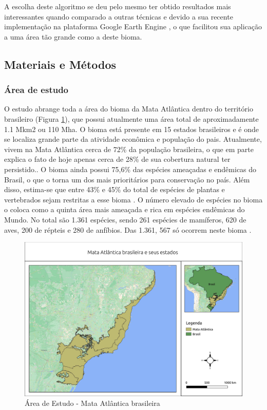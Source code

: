 
A escolha deste algoritmo se deu pelo mesmo ter obtido resultados mais interessantes quando comparado a outras técnicas \citep{Saxena2018} e devido a sua recente implementação na plataforma Google Earth Engine \citep{Kennedy2018}, o que facilitou sua aplicação a uma área tão grande como a deste bioma. 

\subsection{Materiais e Métodos}
\subsubsection{Área de estudo}
\hspace{13pt} O estudo abrange toda a área do bioma da Mata Atlântica dentro do território brasileiro (Figura \ref{fig:mata_atlantica}), que possui atualmente uma área total de aproximadamente 1.1 Mkm2 ou 110 Mha. O bioma está presente em 15 estados brasileiros e é onde se localiza grande parte da atividade econômica e população do pais. Atualmente, vivem na Mata Atlântica cerca de 72\% da população brasileira, o que em parte explica o fato de hoje apenas cerca de 28\% \citep{REZENDE2018208} de sua cobertura natural ter persistido.. O bioma ainda possui 75,6\% das espécies ameaçadas e endêmicas do Brasil, o que o torna um dos mais prioritários para conservação no país. Além disso, estima-se que entre 43\% e 45\% do total de espécies de plantas e vertebrados sejam restritas a esse bioma \citep{scarano2014}. O número elevado de espécies no bioma o coloca como a quinta área mais ameaçada e rica em espécies endêmicas do Mundo. No total são 1.361 espécies, sendo 261 espécies de mamíferos, 620 de aves, 200 de répteis e 280 de anfíbios. Das 1.361, 567 só ocorrem neste bioma \citep{IBGE_BIOMAS}.

\begin{figure}[h!]
    \centering
    \includegraphics[scale=.5]{images/mata_atlantica.pdf}
    \caption{Área de Estudo - Mata Atlântica brasileira}
    \label{fig:mata_atlantica}
\end{figure}

